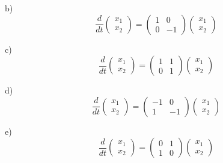 b) 
\begin{equation}
  \label{eq:prob5_2b}
  \frac{d}{dt}\left(
    \begin{array}{c}
      x_1 \\ x_2
    \end{array}
  \right) = 
    \left(
      \begin{array}{cc}
        1 & 0 \\ 0 & -1
      \end{array}
    \right) \left(
      \begin{array}{c}
        x_1 \\ x_2
      \end{array}
      \right)
\end{equation}

c) 
\begin{equation}
  \label{eq:prob5_2c}
  \frac{d}{dt}\left(
    \begin{array}{c}
      x_1 \\ x_2
    \end{array}
  \right) = 
    \left(
      \begin{array}{cc}
        1 & 1 \\ 0 & 1
      \end{array}
    \right) \left(
      \begin{array}{c}
        x_1 \\ x_2
      \end{array}
      \right)
\end{equation}

d) 
\begin{equation}
  \label{eq:prob5_2d}
  \frac{d}{dt}\left(
    \begin{array}{c}
      x_1 \\ x_2
    \end{array}
  \right) = 
    \left(
      \begin{array}{cc}
        -1 & 0 \\ 1 & -1
      \end{array}
    \right) \left(
      \begin{array}{c}
        x_1 \\ x_2
      \end{array}
      \right)
\end{equation}

e) 
\begin{equation}
  \label{eq:prob5_2e}
  \frac{d}{dt}\left(
    \begin{array}{c}
      x_1 \\ x_2
    \end{array}
  \right) = 
    \left(
      \begin{array}{cc}
        0 & 1 \\ 1 & 0
      \end{array}
    \right) \left(
      \begin{array}{c}
        x_1 \\ x_2
      \end{array}
      \right)
\end{equation}

